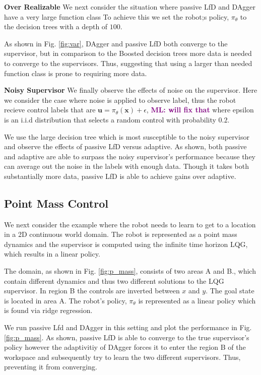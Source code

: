 \documentclass[10pt, conference]{ieeeconf}      %
\newcommand{\bu}{\mathbf{u}}
\newcommand{\bx}{\mathbf{x}}
\newcommand{\mlnote}[1]{\ifthenelse{ \boolean{include-notes}}%
 {\textcolor{purple}{\textbf{ML: #1}}}{}}
\begin{document}
\noindent \textbf{Over Realizable}
We next consider the situation where passive LfD and DAgger have a very large function class To achieve this we  set the robot;s policy, $\pi_{\theta}$ to the decision trees with a depth of $100$.

As shown in Fig. \ref{fig:var}, DAgger and passive LfD both converge to the supervisor, but in comparison to the Boosted decision trees more data is needed to converge to the supervisors. Thus, suggesting that using a larger than needed function class is prone to requiring more data. 

\noindent \textbf{Noisy Supervisor}
We finally observe the effects of noise on the supervisor. Here we consider the case where noise is applied to observe label, thus the robot recieve control labels that are $\bu = \pi_{\theta}(\bx) + \epsilon$, \mlnote{will fix that} where epsilon is an i.i.d distribution that selects a random control with probability $0.2$.

We use the large decision tree which is most susceptible to the noisy supervisor and observe the effects of passive LfD versus adaptive. As shown, both passive and adaptive are able to surpass the noisy supervisor's performance because they can average out the noise in the labels with enough data. Though it takes both substantially more data, passive LfD is able to achieve gains over adaptive. 




\subsection{Point Mass Control}
We next consider the example where the robot needs to learn to get to a location in a 2D continuous world domain. The robot is represented as a point mass dynamics and the supervisor is computed using the infinite time horizon LQG, which results in a linear policy. 

The domain, as shown in Fig. \ref{fig:p_mass}, consists of two areas A and B., which contain different dynamics and thus two different solutions to the LQG supervisor. In region B the controls are inverted between $x$ and $y$.  The goal state is located in area A. The robot's policy, $\pi_{\theta}$ is represented as a linear policy which is found via ridge regression. 

We run passive Lfd and DAgger in this setting and plot the performance in Fig. \ref{fig:p_mass}. As shown, passive LfD is able to converge to the true supervisor's policy however the adaptivitiy of DAgger forces it to enter the region B of the workspace and subsequently try to learn the two different supervisors. Thus, preventing it from converging. 
\end{document}
